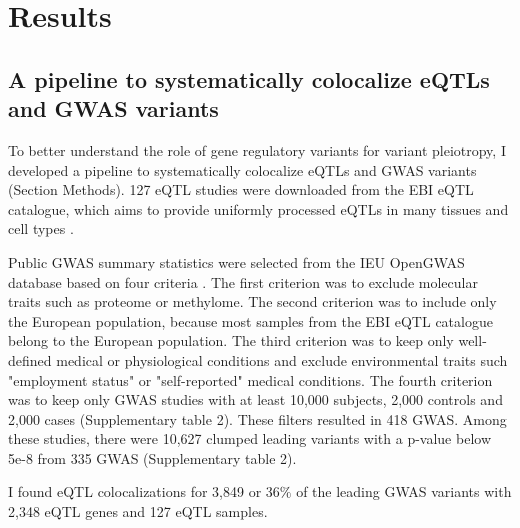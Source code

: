 \section*{Results}\label{s:results}

\subsection*{A pipeline to systematically colocalize eQTLs and GWAS variants}

To better understand the role of gene regulatory variants for variant pleiotropy, I developed a pipeline to systematically colocalize eQTLs and GWAS variants (Section Methods).
%
127 eQTL studies were downloaded from the EBI eQTL catalogue, which aims to provide uniformly processed eQTLs in many tissues and cell types \citep{2021.Alasoo.Kerimov}.

Public GWAS summary statistics were selected from the IEU OpenGWAS database based on four criteria \citep{2018.Parkinson.Buniello}.
%
The first criterion was to exclude molecular traits such as proteome or methylome.
%	
The second criterion was to include only the European population, because most samples from the EBI eQTL catalogue belong to the European population.
%
The third criterion was to keep only well-defined medical or physiological conditions and exclude environmental traits such "employment status" or "self-reported" medical conditions.
%
The fourth criterion was to keep only GWAS studies with at least 10,000 subjects, 2,000 controls and 2,000 cases (Supplementary table 2).
%
These filters resulted in 418 GWAS.
%
Among these studies, there were 10,627 clumped leading variants with a p-value below 5e-8 from 335 GWAS (Supplementary table 2).

I found eQTL colocalizations for 3,849 or 36$\%$ of the leading GWAS variants with 2,348 eQTL genes and 127 eQTL samples.

